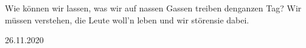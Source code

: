 
\begin{strophe}
\twolinevers
{Wie können wir lassen, was wir auf nassen Gassen treiben den}{ganzen Tag?}
\twolinevers
{Wir müssen verstehen, die Leute woll'n leben und wir stören}{sie dabei.}
\end{strophe}

26.11.2020
